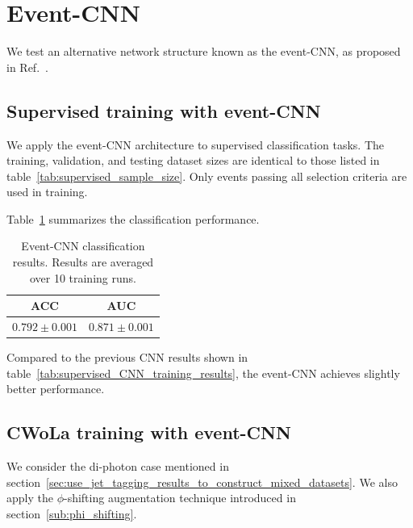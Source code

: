 \documentclass[12pt]{article}
\begin{document}
\section{Event-CNN}%
\label{sec:event_cnn}
	We test an alternative network structure known as the event-CNN, as proposed in Ref.~\cite{Chiang:2022lsn}.
	\subsection{Supervised training with event-CNN}%
	\label{sub:supervised_training_with_event_cnn}
		We apply the event-CNN architecture to supervised classification tasks. The training, validation, and testing dataset sizes are identical to those listed in table~\ref{tab:supervised_sample_size}. Only events passing all selection criteria are used in training.

		Table~\ref{tab:supervised_event_CNN_training_results_diphoton} summarizes the classification performance.
        \begin{table}[htpb]
            \centering
            \caption{Event-CNN classification results. Results are averaged over 10 training runs.}
            \label{tab:supervised_event_CNN_training_results_diphoton}
            \begin{tabular}{c|c}
				 ACC               & AUC               \\ \hline
				 $0.792 \pm 0.001$ & $0.871 \pm 0.001$ \\
			\end{tabular}
        \end{table}
		Compared to the previous CNN results shown in table~\ref{tab:supervised_CNN_training_results}, the event-CNN achieves slightly better performance.
	\subsection{CWoLa training with event-CNN}%
	\label{sub:cwola_training_with_event_cnn}
		We consider the di-photon case mentioned in section~\ref{sec:use_jet_tagging_results_to_construct_mixed_datasets}. We also apply the $\phi$-shifting augmentation technique introduced in section~\ref{sub:phi_shifting}.
		
\end{document}
